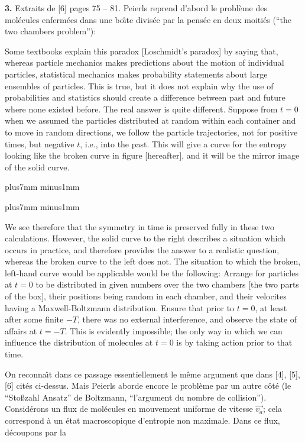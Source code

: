 {\bf 3.}\hskip3mm Extraits de [6] pages 75 -- 81.
\medskip
Peierls reprend d'abord le probl\`eme des mol\'ecules enferm\'ees dans une 
bo{\^\i}te divis\'ee par la pens\'ee en deux moiti\'es (``the two chambers 
problem''):
\medskip
{\cit  Some textbooks explain this paradox [Loschmidt's paradox] by saying
that, whereas particle mechanics makes predictions about the motion of 
individual particles, statistical mechanics makes probability statements 
about large ensembles of particles. This is true, but it does not explain 
why the use of probabilities and statistics should create a difference 
between past and future where none existed before. 
\smallskip
The real answer is quite different. Suppose from $t=0$ when we assumed the 
particles distributed at random within each container and to move in random 
directions, we follow the particle trajectories, not for positive times, but 
negative $t$, i.e., into the past. This will give a curve for the entropy 
looking like the broken curve in figure [hereafter], and it will be the 
mirror image of the solid curve. \par }
\vskip2mm plus7mm minus1mm
\epsfxsize=100mm
\centerline{}
\vskip2mm plus7mm minus1mm
{\cit  We see therefore that the symmetry in time is preserved fully in these
two calculations. However, the solid curve to the right describes a situation 
which occurs in practice, and therefore provides the answer to a realistic 
question, whereas the broken curve to the left does not. 
\smallskip
The situation to which the broken, left-hand curve would be applicable 
would be the following: Arrange for particles at $t=0$ to be distributed 
in given numbers over the two chambers [the two parts of the box], their 
positions being random in each chamber, and their velocites having a 
Maxwell-Boltzmann distribution. Ensure that prior to $t=0$, at least after 
some finite $-T$, there was no external interference, and observe the state 
of affairs at $t = -T$. This is evidently impossible; the only way in which 
we can influence the distribution of molecules at $t=0$ is by taking action 
prior to that time. \par }
\medskip
On reconna{\^\i}t dans ce passage essentiellement le m\^eme argument que 
dans [4], [5], [6] cit\'es ci-dessus. Mais Peierls aborde encore le 
probl\`eme par un autre c\^ot\'e (le ``Sto{\ss}zahl Ansatz'' de Boltzmann, 
``l'argument du nombre de collision''). Consid\'erons un flux de mol\'ecules 
en mouvement uniforme de vitesse $\vec{v_a}$; cela correspond \`a un \'etat 
macroscopique d'entropie non maximale. Dans ce flux, d\'ecoupons par la 
